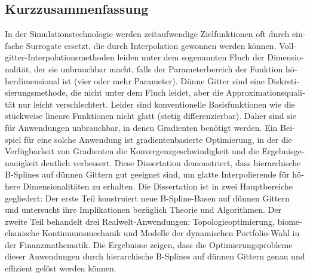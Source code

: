 \begin{otherlanguage}{ngerman}
  \section*{Kurzzusammenfassung}
  
  In der Simulationstechnologie werden zeitaufwendige Zielfunktionen
  oft durch einfache Surrogate ersetzt, die durch Interpolation
  gewonnen werden können.
  Vollgitter-Interpolationsmethoden leiden unter dem
  sogenannten Fluch der Dimensionalität,
  der sie unbrauchbar macht, falls der Parameterbereich der Funktion
  höherdimensional ist (vier oder mehr Parameter).
  Dünne Gitter sind eine Diskretisierungsmethode, die nicht unter
  dem Fluch leidet, aber die Approximationsqualität nur leicht verschlechtert.
  Leider sind konventionelle Basisfunktionen wie die stückweise
  lineare Funktionen nicht glatt (stetig differenzierbar).
  Daher sind sie für Anwendungen unbrauchbar, in denen Gradienten
  benötigt werden.
  Ein Beispiel für eine solche Anwendung ist gradientenbasierte Optimierung,
  in der die Verfügbarkeit von Gradienten die Konvergenzgeschwindigkeit und
  die Ergebnisgenauigkeit deutlich verbessert.
  Diese Dissertation demonstriert, dass hierarchische B-Splines auf
  dünnen Gittern gut geeignet sind,
  um glatte Interpolierende für höhere Dimensionalitäten zu erhalten.
  Die Dissertation ist in zwei Hauptbereiche gegliedert:
  Der erste Teil konstruiert neue B-Spline-Basen auf dünnen Gittern und
  untersucht ihre Implikationen bezüglich Theorie und Algorithmen.
  Der zweite Teil behandelt drei Realwelt-Anwendungen:
  Topologieoptimierung, biomechanische Kontinuumsmechanik und
  Modelle der dynamischen Portfolio-Wahl in der Finanzmathematik.
  Die Ergebnisse zeigen, dass die Optimierungsprobleme dieser
  Anwendungen durch hierarchische B-Splines auf dünnen Gittern
  genau und effizient gelöst werden können.
\end{otherlanguage}
